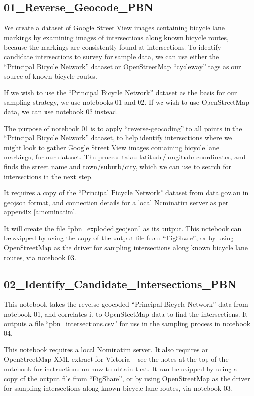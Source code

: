 \documentclass[11pt,twoside]{report}
\begin{document}
\subsection{01\_Reverse\_Geocode\_PBN}
\label{aj:01}

We create a dataset of Google Street View images containing bicycle lane markings by examining images of intersections along known bicycle routes, because the markings are consistently found at intersections.  To identify candidate intersections to survey for sample data, we can use either the ``Principal Bicycle Network'' dataset or OpenStreetMap ``cycleway'' tags as our source of known bicycle routes.

If we wish to use the ``Principal Bicycle Network'' dataset as the basis for our sampling strategy, we use notebooks 01 and 02.  If we wish to use OpenStreetMap data, we can use notebook 03 instead.

The purpose of notebook 01 is to apply ``reverse-geocoding'' to all points in the ``Principal Bicycle Network'' dataset, to help identify intersections where we might look to gather Google Street View images containing bicycle lane markings, for our dataset.  The process takes latitude/longitude coordinates, and finds the street name and town/suburb/city, which we can use to search for intersections in the next step.

It requires a copy of the ``Principal Bicycle Network'' dataset from \url{data.gov.au} in geojson format, and connection details for a local Nominatim server as per appendix \ref{a:nominatim}.

It will create the file ``pbn\_exploded.geojson'' as its output.  This notebook can be skipped by using the copy of the output file from ``FigShare'', or by using OpenStreetMap as the driver for sampling intersections along known bicycle lane routes, via notebook 03.


\subsection{02\_Identify\_Candidate\_Intersections\_PBN}
\label{aj02}

This notebook takes the reverse-geocoded ``Principal Bicycle Network'' data from notebook 01, and correlates it to OpenSteetMap data to find the intersections.  It outputs a file ``pbn\_intersections.csv'' for use in the sampling process in notebook 04.

This notebook requires a local Nominatim server.  It also requires an OpenStreetMap XML extract for Victoria -- see the notes at the top of the notebook for instructions on how to obtain that.  It can be skipped by using a copy of the output file from ``FigShare'', or by using OpenStreetMap as the driver for sampling intersections along known bicycle lane routes, via notebook 03.
\end{document}
